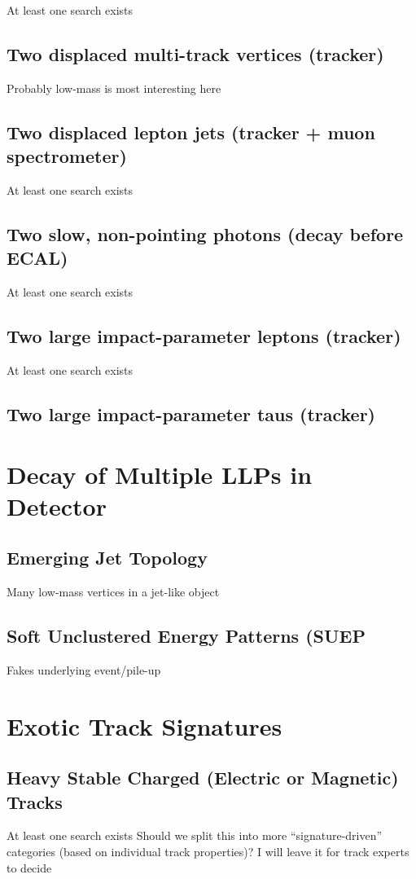 At least one search exists

\subsection{Two displaced multi-track vertices (tracker)}
Probably low-mass is most interesting here

\subsection{Two displaced lepton jets (tracker + muon spectrometer)}
At least one search exists

\subsection{Two slow, non-pointing photons (decay before ECAL)}
At least one search exists

\subsection{Two large impact-parameter leptons (tracker)}
At least one search exists

\subsection{Two large impact-parameter taus (tracker)}

\section{Decay of Multiple LLPs in Detector}

\subsection{Emerging Jet Topology}
Many low-mass vertices in a jet-like object

\subsection{Soft Unclustered Energy Patterns (SUEP}
Fakes underlying event/pile-up

\section{Exotic Track Signatures}

\subsection{Heavy Stable Charged (Electric or Magnetic) Tracks}
At least one search exists
Should we split this into more ``signature-driven'' categories (based on individual track properties)? I will leave it for track experts to decide

